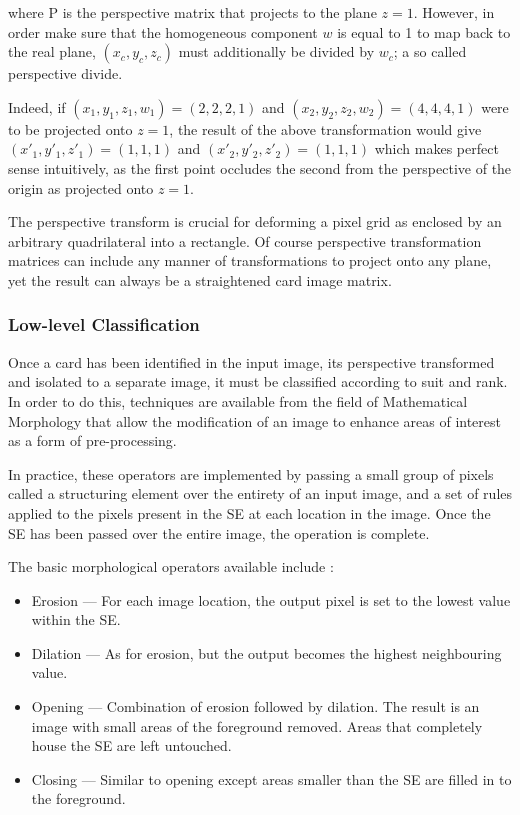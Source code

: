 \documentclass[a4paper,12pt,notitlepage]{article}
\begin{document}
			where P is the perspective matrix that projects to the plane $z = 1$. However, in order make sure that the homogeneous component $w$ is equal to 1 to map back to the real plane, $(x_c, y_c, z_c)$ must additionally be divided by $w_c$; a so called perspective divide.

			Indeed, if $(x_1, y_1, z_1, w_1) = (2, 2, 2, 1)$ and $(x_2, y_2, z_2, w_2) = (4, 4, 4, 1)$ were to be projected onto $z = 1$, the result of the above transformation would give $(x'_1, y'_1, z'_1) = (1, 1, 1)$ and $(x'_2, y'_2, z'_2) = (1, 1, 1)$ which makes perfect sense intuitively, as the first point occludes the second from the perspective of the origin as projected onto $z = 1$.

			The perspective transform is crucial for deforming a pixel grid as enclosed by an arbitrary quadrilateral into a rectangle. Of course perspective transformation matrices can include any manner of transformations to project onto any plane, yet the result can always be a straightened card image matrix.
		\subsubsection{Low-level Classification}
			Once a card has been identified in the input image, its perspective transformed and isolated to a separate image, it must be classified according to suit and rank. In order to do this, techniques are available from the field of Mathematical Morphology that allow the modification of an image to enhance areas of interest as a form of pre-processing.

			In practice, these operators are implemented by passing a small group of pixels called a structuring element over the entirety of an input image, and a set of rules applied to the pixels present in the SE at each location in the image. Once the SE has been passed over the entire image, the operation is complete.

			The basic morphological operators available include \autocite{sonka1999image1}:

			\begin{itemize}
				\item Erosion --- For each image location, the output pixel is set to the lowest value within the SE.
				\item Dilation --- As for erosion, but the output becomes the highest neighbouring value. 
				\item Opening --- Combination of erosion followed by dilation. The result is an image with small areas of the foreground removed. Areas that completely house the SE are left untouched.
				\item Closing --- Similar to opening except areas smaller than the SE are filled in to the foreground.
			\end{itemize}
\end{document}
